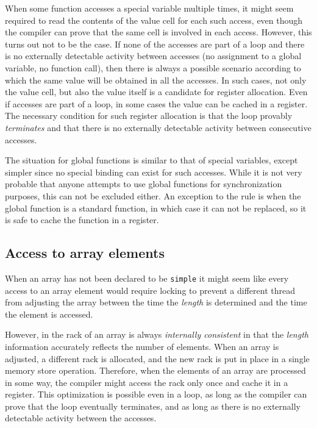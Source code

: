 When some function accesses a special variable multiple times, it
might seem required to read the contents of the value cell for each
such access, even though the compiler can prove that the same cell is
involved in each access.  However, this turns out not to be the case.
If none of the accesses are part of a loop and there is no externally
detectable activity between accesses (no assignment to a global
variable, no function call), then there is always a possible scenario
according to which the same value will be obtained in all the
accesses.  In such cases, not only the value cell, but also the value
itself is a candidate for register allocation.  Even if accesses are
part of a loop, in some cases the value can be cached in a register.
The necessary condition for such register allocation is that the loop
provably \emph{terminates} and that there is no externally detectable
activity between consecutive accesses. 

The situation for global functions is similar to that of special
variables, except simpler since no special binding can exist for such
accesses.  While it is not very probable that anyone attempts to use
global functions for synchronization purposes, this can not be
excluded either.  An exception to the rule is when the global function
is a standard \commonlisp{} function, in which case it can not be replaced, so
it is safe to cache the function in a register. 

\subsection{Access to array elements}

When an array has not been declared to be \texttt{simple} it might
seem like every access to an array element would require locking to
prevent a different thread from adjusting the array between the time
the \emph{length} is determined and the time the element is accessed.

However, in \sysname{} the rack of an array is always
\emph{internally consistent} in that the \emph{length} information
accurately reflects the number of elements.  When an array is
adjusted, a different rack is allocated, and the new
rack is put in place in a single memory store operation.
Therefore, when the elements of an array are processed in some way,
the compiler might access the rack only once and cache it
in a register.  This optimization is possible even in a loop, as long
as the compiler can prove that the loop eventually terminates, and as
long as there is no externally detectable activity between the
accesses. 

